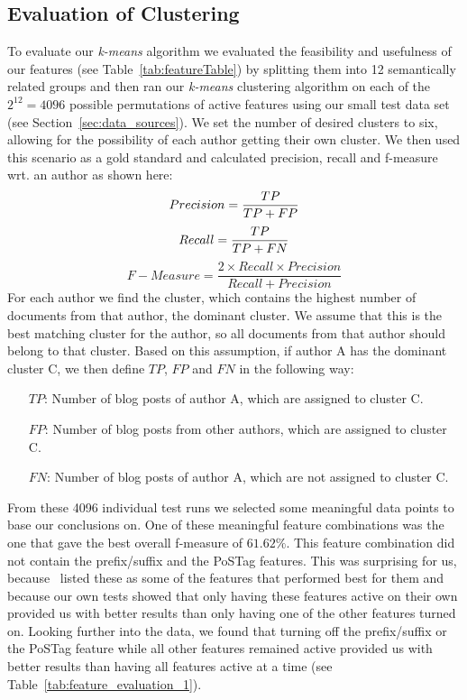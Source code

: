 \subsection{Evaluation of Clustering}
\label{sec:evaluation_clustering}
To evaluate our \textit{k-means} algorithm we evaluated the feasibility and usefulness of our features (see Table~\ref{tab:featureTable}) by splitting them into 12 semantically related groups and then ran our \textit{k-means} clustering algorithm on each of the $2^{12} = 4096$ possible permutations of active features using our small test data set (see Section~\ref{sec:data_sources}).
We set the number of desired clusters to six, allowing for the possibility of each author getting their own cluster.
We then used this scenario as a gold standard and calculated precision, recall and f-measure wrt. an author as shown here:
\begin{equation}
	Precision = \frac{TP}{TP + FP} \\
	\label{eq:precision}
\end{equation}
\begin{equation}
	Recall = \frac{TP}{TP + FN} \\
	\label{eq:recall}
\end{equation}
\begin{equation}
	F-Measure = \frac{2 \times Recall \times Precision}{Recall + Precision}
	\label{eq:fMeasure}
\end{equation}
For each author we find the cluster, which contains the highest number of documents from that author, the dominant cluster.
We assume that this is the best matching cluster for the author, so all documents from that author should belong to that cluster.
Based on this assumption, if author A has the dominant cluster C, we then define $TP$, $FP$ and $FN$ in the following way:
\begin{itemize}
	\item[$TP$:] Number of blog posts of author A, which are assigned to cluster C. \\
	\item[$FP$:] Number of blog posts from other authors, which are assigned to cluster C. \\
	\item[$FN$:] Number of blog posts of author A, which are not assigned to cluster C.
\end{itemize}

From these 4096 individual test runs we selected some meaningful data points to base our conclusions on.
One of these meaningful feature combinations was the one that gave the best overall f-measure of $61.62\%$.
This feature combination did not contain the prefix/suffix and the PoSTag features.
This was surprising for us, because~\cite{madigan2005author} listed these as some of the features that performed best for them and because our own tests showed that only having these features active on their own provided us with better results than only having one of the other features turned on.
Looking further into the data, we found that turning off the prefix/suffix or the PoSTag feature while all other features remained active provided us with better results than having all features active at a time (see Table~\ref{tab:feature_evaluation_1}).

